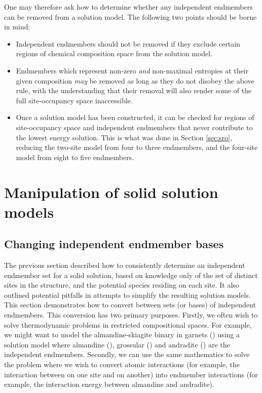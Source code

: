 \documentclass[preprint,12pt]{elsarticle}
\begin{document}
One may therefore ask how to determine whether any independent endmembers can be removed from a solution model. The following two points should be borne in mind:
\begin{itemize}
    \item Independent endmembers should not be removed if they exclude certain regions of chemical composition space from the solution model. 
    \item Endmembers which represent non-zero \textit{and} non-maximal entropies at their given composition \textit{may} be removed as long as they do not disobey the above rule, with the understanding that their removal will also render some of the full site-occupancy space inaccessible.
    \item Once a solution model has been constructed, it can be checked for regions of site-occupancy space and independent endmembers that never contribute to the lowest energy solution. This is what was done in Section \ref{sec:sro}, reducing the two-site model from four to three endmembers, and the four-site model from eight to five endmembers. 
\end{itemize}

\section{Manipulation of solid solution models}
\label{sec:manipulation}
\subsection{Changing independent endmember bases}
\label{sec:basis_conversion}

The previous section described how to consistently determine an independent endmember set for a solid solution, based on knowledge only of the set of distinct sites in the structure, and the potential species residing on each site. It also outlined potential pitfalls in attempts to simplify the resulting solution models. This section demonstrates how to convert between sets (or bases) of independent endmembers. This conversion has two primary purposes. Firstly, we often wish to solve thermodynamic problems in restricted compositional spaces. For example, we might want to model the almandine-skiagite binary in garnets () using a solution model where almandine (), grossular () and andradite () are the independent endmembers. Secondly, we can use the same mathematics to solve the problem where we wish to convert atomic interactions (for example, the interaction between  on one site and  on another) into endmember interactions (for example, the interaction energy between almandine and andradite).
\end{document}
